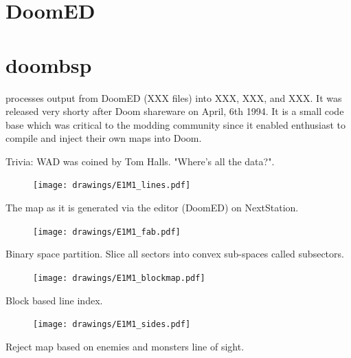 \section{DoomED}
\par
{}
\par
{}
\par
{}

\section{doombsp}
 processes output from DoomED (XXX files) into XXX, XXX, and XXX. It was released very shorty after Doom shareware on April, 6th 1994. It is a small code base which was critical to the modding community since it enabled enthusiast to compile and inject their own maps into Doom.\\
\par
{}
\par
Trivia: WAD was coined by Tom Halls. "Where's all the data?".\\
\par

\par
\begin{figure}[H]
\centering
\texttt{[image: drawings/E1M1\_lines.pdf]}
\end{figure}
\par
The map as it is generated via the editor (DoomED) on NextStation.\\
\par
\begin{figure}[H]
\centering
\texttt{[image: drawings/E1M1\_fab.pdf]}
\end{figure}
\par
Binary space partition. Slice all sectors into convex sub-spaces called subsectors.\\
\par
\begin{figure}[H]
\centering
\texttt{[image: drawings/E1M1\_blockmap.pdf]}
\end{figure}
\par
Block based line index.\\
\par
\begin{figure}[H]
\centering
\texttt{[image: drawings/E1M1\_sides.pdf]}
\end{figure}
\par
Reject map based on enemies and monsters line of sight.\\


